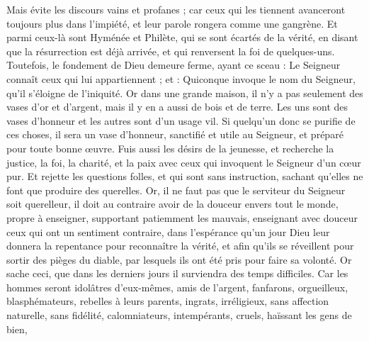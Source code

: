 \begin{multicols}{2}
Mais évite les discours vains et profanes ; car ceux qui les tiennent avanceront toujours plus dans l'impiété,
et leur parole rongera comme une gangrène. Et parmi ceux-là sont Hyménée et Philète,
qui se sont écartés de la vérité, en disant que la résurrection est déjà arrivée, et qui renversent la foi de quelques-uns.
Toutefois, le fondement de Dieu demeure ferme, ayant ce sceau : Le Seigneur connaît ceux qui lui appartiennent ; et : Quiconque invoque le nom du Seigneur, qu'il s’éloigne de l'iniquité.
Or dans une grande maison, il n'y a pas seulement des vases d'or et d'argent, mais il y en a aussi de bois et de terre. Les uns sont des vases d’honneur et les autres sont d’un usage vil.
Si quelqu'un donc se purifie de ces choses, il sera un vase d’honneur, sanctifié et utile au Seigneur, et préparé pour toute bonne œuvre.
Fuis aussi les désirs de la jeunesse, et recherche la justice, la foi, la charité, et la paix avec ceux qui invoquent le Seigneur d'un cœur pur.
Et rejette les questions folles, et qui sont sans instruction, sachant qu'elles ne font que produire des querelles.
Or, il ne faut pas que le serviteur du Seigneur soit querelleur, il doit au contraire avoir de la douceur envers tout le monde, propre à enseigner, supportant patiemment les mauvais,
enseignant avec douceur ceux qui ont un sentiment contraire, dans l'espérance qu'un jour Dieu leur donnera la repentance pour reconnaître la vérité,
et afin qu'ils se réveillent pour sortir des pièges du diable, par lesquels ils ont été pris pour faire sa volonté.
\VerseOne{}Or sache ceci, que dans les derniers jours il surviendra des temps difficiles.
Car les hommes seront idolâtres d’eux-mêmes, amis de l’argent, fanfarons, orgueilleux, blasphémateurs, rebelles à leurs parents, ingrats, irréligieux,
sans affection naturelle, sans fidélité, calomniateurs, intempérants, cruels, haïssant les gens de bien,

\end{multicols}
